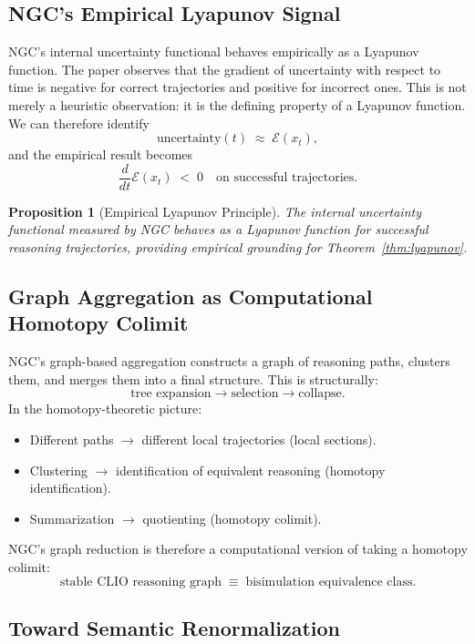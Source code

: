 \documentclass[11pt, letterpaper]{article}
\theoremstyle{plain}
\newtheorem{proposition}[theorem]{Proposition}
\theoremstyle{definition}
\theoremstyle{remark}
\newcommand{\EE}{\mathcal{E}}
\begin{document}
\subsection{NGC's Empirical Lyapunov Signal}

NGC's internal uncertainty functional behaves empirically as a Lyapunov function. The
paper observes that the gradient of uncertainty with respect to time is negative for
correct trajectories and positive for incorrect ones. This is not merely a heuristic
observation: it is the defining property of a Lyapunov function. We can therefore
identify
\[
  \text{uncertainty}(t) \;\approx\; \EE(x_t),
\]
and the empirical result becomes
\[
  \frac{d}{dt}\EE(x_t) \;<\; 0 \quad\text{on successful trajectories.}
\]

\begin{proposition}[Empirical Lyapunov Principle]
The internal uncertainty functional measured by NGC behaves as a Lyapunov function for
successful reasoning trajectories, providing empirical grounding for Theorem~\ref{thm:lyapunov}.
\end{proposition}

\subsection{Graph Aggregation as Computational Homotopy Colimit}

NGC's graph-based aggregation constructs a graph of reasoning paths, clusters them, and
merges them into a final structure. This is structurally:
\[
  \text{tree expansion} \to \text{selection} \to \text{collapse}.
\]
In the homotopy-theoretic picture:
\begin{itemize}[noitemsep]
  \item Different paths $\to$ different local trajectories (local sections).
  \item Clustering $\to$ identification of equivalent reasoning (homotopy identification).
  \item Summarization $\to$ quotienting (homotopy colimit).
\end{itemize}
NGC's graph reduction is therefore a computational version of taking a homotopy
colimit:
\[
  \text{stable CLIO reasoning graph} \;\equiv\; \text{bisimulation equivalence class}.
\]

\subsection{Toward Semantic Renormalization}
\end{document}
